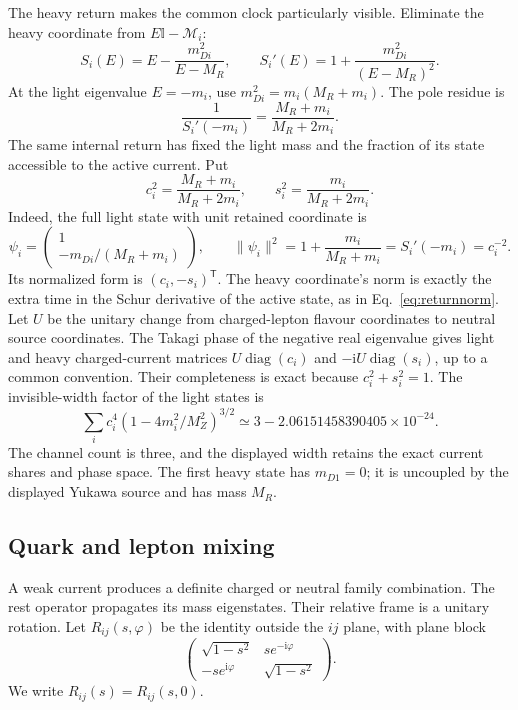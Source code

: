 \documentclass[aps,prx,onecolumn,10pt,notitlepage,nofootinbib,longbibliography]{revtex4-2}
\numberwithin{equation}{section}
\numberwithin{table}{section}
\newcommand{\Id}{\mathbb I}
\newcommand{\diag}{\operatorname{diag}}
\newcommand{\ii}{\mathrm i}
\newcommand{\MR}{M_R}
\begin{document}
The heavy return makes the common clock particularly visible. Eliminate the heavy coordinate from $E\Id-\mathcal M_i$:
\begin{equation}
 S_i(E)=E-\frac{m_{Di}^2}{E-\MR},\qquad
 S_i'(E)=1+\frac{m_{Di}^2}{(E-\MR)^2}.
 \label{eq:neutrinoschur}
\end{equation}
At the light eigenvalue $E=-m_i$, use $m_{Di}^2=m_i(\MR+m_i)$. The pole residue is
\begin{equation}
 \frac1{S_i'(-m_i)}=\frac{\MR+m_i}{\MR+2m_i}.
 \label{eq:neutrinoresidue}
\end{equation}
The same internal return has fixed the light mass and the fraction of its state accessible to the active current. Put
\begin{equation}
 c_i^2=\frac{\MR+m_i}{\MR+2m_i},\qquad
 s_i^2=\frac{m_i}{\MR+2m_i}.
\end{equation}
Indeed, the full light state with unit retained coordinate is
\begin{equation}
 \psi_i=\begin{pmatrix}1\\-m_{Di}/(\MR+m_i)\end{pmatrix},\qquad
 \|\psi_i\|^2=1+\frac{m_i}{\MR+m_i}
 =S_i'(-m_i)=c_i^{-2}.
 \label{eq:neutralfullnorm}
\end{equation}
Its normalized form is $(c_i,-s_i)^{\mathsf T}$. The heavy coordinate's norm is exactly the extra time in the Schur derivative of the active state, as in Eq.~\eqref{eq:returnnorm}.
Let $U$ be the unitary change from charged-lepton flavour coordinates to neutral source coordinates. The Takagi phase of the negative real eigenvalue gives light and heavy charged-current matrices $U\diag(c_i)$ and $-\ii U\diag(s_i)$, up to a common convention. Their completeness is exact because $c_i^2+s_i^2=1$. The invisible-width factor of the light states is
\begin{equation}
 \sum_i c_i^4(1-4m_i^2/M_Z^2)^{3/2}
 \simeq3-2.06151458390405\times10^{-24}.
\end{equation}
The channel count is three, and the displayed width retains the exact current shares and phase space. The first heavy state has $m_{D1}=0$; it is uncoupled by the displayed Yukawa source and has mass $\MR$.

\subsection{Quark and lepton mixing}
A weak current produces a definite charged or neutral family combination. The rest operator propagates its mass eigenstates. Their relative frame is a unitary rotation. Let $R_{ij}(s,\varphi)$ be the identity outside the $ij$ plane, with plane block
\begin{equation}
 \begin{pmatrix}\sqrt{1-s^2}&se^{-\ii\varphi}\\-se^{\ii\varphi}&\sqrt{1-s^2}\end{pmatrix}.
\end{equation}
We write $R_{ij}(s)=R_{ij}(s,0)$. 
\end{document}
